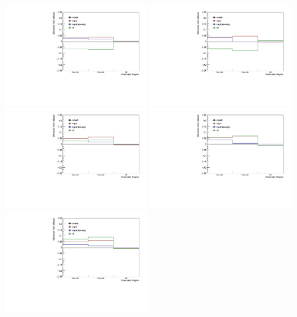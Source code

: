 \begin{figure}[ht]
    \centering
    \includegraphics[width=0.48\textwidth]{figures/analysis/h_lambda_0_20_lowpt_yield_variation.pdf}
    \includegraphics[width=0.48\textwidth]{figures/analysis/h_lambda_0_20_highpt_yield_variation.pdf}
    \includegraphics[width=0.48\textwidth]{figures/analysis/h_lambda_20_50_lowpt_yield_variation.pdf}
    \includegraphics[width=0.48\textwidth]{figures/analysis/h_lambda_20_50_highpt_yield_variation.pdf}
    \includegraphics[width=0.48\textwidth]{figures/analysis/h_lambda_50_80_lowpt_yield_variation.pdf}

\end{figure}
